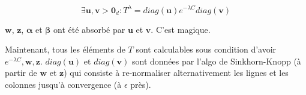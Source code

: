 \begin{equation}
  \exists \mathbf{u},\mathbf{v} > \mathbf{0}_d : T^\lambda = diag(\mathbf{u}) e^{-\lambda C} diag(\mathbf{v})
\end{equation}

$\mathbf w$, $\mathbf z$, $\boldsymbol\alpha$ et $\boldsymbol\beta$ ont été absorbé par $\mathbf{u}$ et $\mathbf{v}$. C'est magique.


Maintenant, tous les éléments de $T$ sont calculables sous condition d'avoir $e^{-\lambda C},\mathbf w,\mathbf z$.
$diag(\mathbf{u})$ et $diag(\mathbf{v})$ sont données par l'algo de Sinkhorn-Knopp
(à partir de $\mathbf w$ et $\mathbf z$)
qui consiste à re-normaliser alternativement les lignes et les colonnes jusqu'à 
convergence (à $\epsilon$ près).



